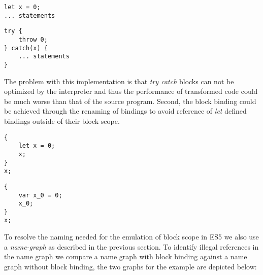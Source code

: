 \begin{minipage}{0.45\linewidth}
\begin{lstlisting}
let x = 0;
... statements
\end{lstlisting}
\end{minipage}
\hfill
\begin{minipage}{0.45\linewidth}
\begin{lstlisting}
try {
	throw 0;
} catch(x) {
	... statements
}
\end{lstlisting}
\end{minipage}

The problem with this implementation is that \textit{try catch} blocks can not be optimized by the interpreter and thus the performance of transformed code could be much worse than that of the source program. Second, the block binding could be achieved through the renaming of bindings to avoid reference of \textit{let} defined bindings outside of their block scope.

\begin{minipage}{0.45\linewidth}
\begin{lstlisting}
{
	let x = 0;
	x;
}
x;
\end{lstlisting}
\end{minipage}
\hfill
\begin{minipage}{0.45\linewidth}
\begin{lstlisting}
{
	var x_0 = 0;
	x_0;
}
x;
\end{lstlisting}
\end{minipage}

To resolve the naming needed for the emulation of block scope in ES5 we also use a \textit{name-graph} as described in the previous section. To identify illegal references in the name graph we compare a name graph with block binding against a name graph without block binding, the two graphs for the example are depicted below:

